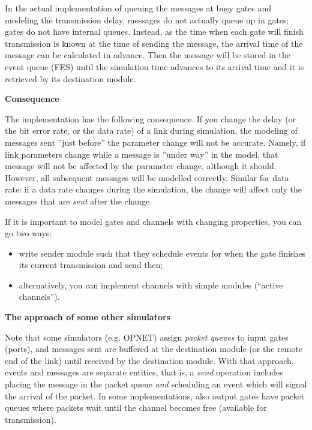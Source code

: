 In the actual implementation of queuing the messages at busy gates and
modeling the transmission delay, messages do not actually queue up in
gates; gates do not have internal queues. Instead, as the time when
each gate will finish transmission is known at the time of sending the
message, the arrival time of the message can be
calculated in advance. Then the message will be stored in the event
queue (FES) until the simulation time advances to its
arrival time and it is retrieved by its destination module.

%
%


\textbf{Consequence}


The implementation has the following consequence. If you change the
delay (or the bit error rate, or the data rate) of a link during simulation, the modeling of messages sent ''just
before'' the parameter change will not be accurate. Namely, if link
parameters change while a message is ''under way'' in the model, that
message will not be affected by the parameter change, although it
should. However, all subsequent messages will be modelled correctly.
Similar for data rate: if a data rate changes during the simulation,
the change will affect only the messages that are \textit{sent} after
the change.

If it is important to model gates and channels with changing
properties, you can go two ways:
\begin{itemize}
  \item{write sender module such that they schedule events for when the
    gate finishes its current transmission and send then;}
  \item{alternatively, you can implement channels with
    simple modules (``active channels'').}
\end{itemize}

\textbf{The approach of some other simulators}


Note that some simulators (e.g. OPNET) assign \textit{packet queues}
to input gates (ports), and messages sent are buffered at the
destination module (or the remote end of the link) until received by
the destination module. With that approach, events and messages are
separate entities, that is, a \textit{send} operation includes placing
the message in the packet queue \textit{and} scheduling an event which
will signal the arrival of the packet. In some implementations, also
output gates have packet queues where packets wait until the channel
becomes free (available for transmission).

